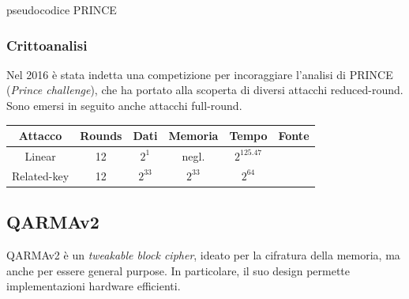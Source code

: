 \documentclass[target=bach,aauheader=,style=]{thud}
\begin{document}
			\begin{algorithm}
				\caption{pseudocodice PRINCE}
				\begin{algorithmic}
					\EndFor
					\EndFor
					\EndProcedure
				\end{algorithmic}
			\end{algorithm}
			
			\subsubsection{Crittoanalisi}
			Nel 2016 è stata indetta una competizione per incoraggiare l'analisi di PRINCE (\textit{Prince challenge}), che ha portato alla scoperta di diversi attacchi reduced-round. Sono emersi in seguito anche attacchi full-round.
			\begin{center}
				\begin{tabular}{ |c|c|c|c|c|c| } 
					\hline
					Attacco & Rounds & Dati & Memoria & Tempo & Fonte \\ 
					\hline 
					\hline
					Linear & 12 & $2^1$ & negl. & $2^{125.47}$ & \cite{princesec}\\
					\hline
					Related-key & 12 & $2^{33}$ & $2^{33}$ & $2^{64}$ & \cite{princesec}\\
					\hline
				\end{tabular}
			\end{center}
		\subsection{QARMAv2}
		QARMAv2 è un \textit{tweakable block cipher}, ideato per la cifratura della memoria, ma anche per essere general purpose\cite{qarmav2}. In particolare, il suo design permette implementazioni hardware efficienti.
\end{document}
